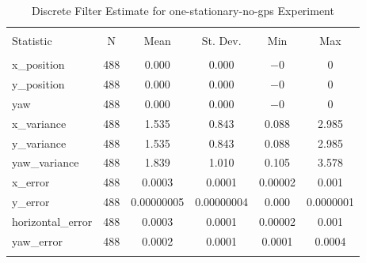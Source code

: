 
\begin{table}[h] \centering 
  \caption{Discrete Filter Estimate for one-stationary-no-gps Experiment} 
  \label{tab:one_stationary_no_gps_discrete_summary} 
\begin{tabular}{@{\extracolsep{5pt}}lccccc} 
\\[-1.8ex]\hline 
\hline \\[-1.8ex] 
Statistic & \multicolumn{1}{c}{N} & \multicolumn{1}{c}{Mean} & \multicolumn{1}{c}{St. Dev.} & \multicolumn{1}{c}{Min} & \multicolumn{1}{c}{Max} \\ 
\hline \\[-1.8ex] 
x\_position & 488 & 0.000 & 0.000 & $-$0 & 0 \\ 
y\_position & 488 & 0.000 & 0.000 & $-$0 & 0 \\ 
yaw & 488 & 0.000 & 0.000 & $-$0 & 0 \\ 
x\_variance & 488 & 1.535 & 0.843 & 0.088 & 2.985 \\ 
y\_variance & 488 & 1.535 & 0.843 & 0.088 & 2.985 \\ 
yaw\_variance & 488 & 1.839 & 1.010 & 0.105 & 3.578 \\ 
x\_error & 488 & 0.0003 & 0.0001 & 0.00002 & 0.001 \\ 
y\_error & 488 & 0.00000005 & 0.00000004 & 0.000 & 0.0000001 \\ 
horizontal\_error & 488 & 0.0003 & 0.0001 & 0.00002 & 0.001 \\ 
yaw\_error & 488 & 0.0002 & 0.0001 & 0.0001 & 0.0004 \\ 
\hline \\[-1.8ex] 
\end{tabular} 
\end{table} 

